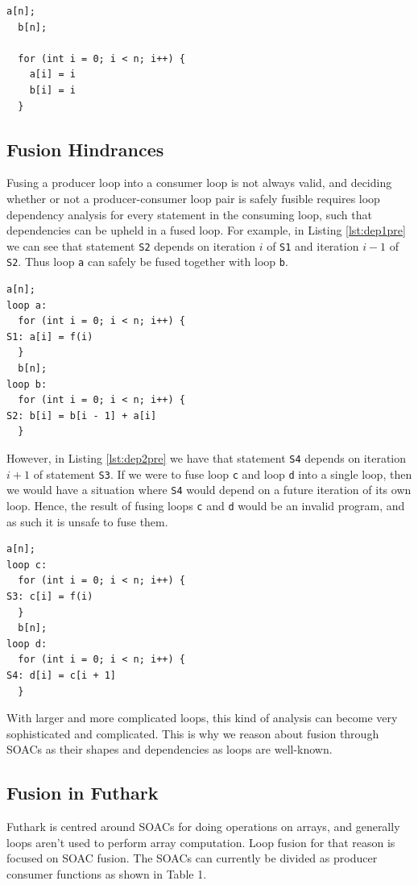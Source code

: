 \documentclass[11pt,bibliography=totocnumbered]{article}
\begin{document}
\begin{lstlisting}[caption=Post-fusion,label={lst:horipost}]
  a[n];
  b[n];
  
  for (int i = 0; i < n; i++) {
    a[i] = i
    b[i] = i  
  }
\end{lstlisting}

\subsection{Fusion Hindrances}
Fusing a producer loop into a consumer loop is not always valid, and deciding whether or not a producer-consumer loop pair is safely fusible requires loop dependency analysis for every statement 
 in the consuming loop, such that dependencies can be upheld in a fused loop.
 For example, in Listing \ref{lst:dep1pre} we can see that statement \texttt{S2} depends on iteration $i$ of \texttt{S1} and iteration $i-1$ of \texttt{S2}. Thus loop \texttt{a} can safely be fused together
 with loop \texttt{b}.

\begin{lstlisting}[caption=Example dependencies,label={lst:dep1pre}]
  a[n];
loop a:
  for (int i = 0; i < n; i++) {
S1: a[i] = f(i)
  }
  b[n];
loop b:
  for (int i = 0; i < n; i++) {
S2: b[i] = b[i - 1] + a[i]  
  }
\end{lstlisting}
However, in Listing \ref{lst:dep2pre} we have that statement \texttt{S4} depends on iteration $i+1$ of statement \texttt{S3}. If we were to fuse loop \texttt{c} and loop \texttt{d} into a single loop, then we would
 have a situation where \texttt{S4} would depend on a future iteration of its own loop. Hence, the result of fusing loops \texttt{c} and \texttt{d} would be an invalid program, and as such it is unsafe to fuse them.
\begin{lstlisting}[caption=Example dependencies,label={lst:dep2pre}]
  a[n];
loop c:
  for (int i = 0; i < n; i++) {
S3: c[i] = f(i)
  }
  b[n];
loop d:
  for (int i = 0; i < n; i++) {
S4: d[i] = c[i + 1]  
  }
\end{lstlisting}
With larger and more complicated loops, this kind of analysis can become very sophisticated and complicated. This is why we reason about fusion through SOACs as their shapes and dependencies as loops
 are well-known.
\subsection{Fusion in Futhark}
Futhark is centred around SOACs for doing operations on arrays, and generally loops aren't used to perform array computation. Loop fusion for that reason is focused on SOAC fusion. The SOACs can currently be divided as producer consumer functions as shown in Table 1.
\clearpage
\end{document}
